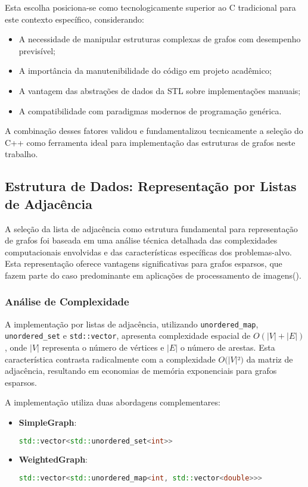 \documentclass{sbc2023}%
\begin{document}
Esta escolha posiciona-se como tecnologicamente superior ao C tradicional para este contexto específico, considerando:
\begin{itemize}
\item A necessidade de manipular estruturas complexas de grafos com desempenho previsível;
\item A importância da manutenibilidade do código em projeto acadêmico;
\item A vantagem das abstrações de dados da STL sobre implementações manuais;
\item A compatibilidade com paradigmas modernos de programação genérica.
\end{itemize}

A combinação desses fatores validou e fundamentalizou tecnicamente a seleção do C++ como ferramenta ideal para implementação das estruturas de grafos neste trabalho.

\subsection{Estrutura de Dados: Representação por Listas de Adjacência}

A seleção da lista de adjacência como estrutura fundamental para representação de grafos foi baseada em uma análise técnica detalhada das complexidades computacionais envolvidas e das características específicas dos problemas-alvo. Esta representação oferece vantagens significativas para grafos esparsos, que fazem parte do caso predominante em aplicações de processamento de imagens(\cite{boost-adjacency-list}).

\subsubsection{Análise de Complexidade}
A implementação por listas de adjacência, utilizando \texttt{unordered\_map}, \texttt{unordered\_set} e \texttt{std::vector}, apresenta complexidade espacial de \(O(|V| + |E|)\), onde \(|V|\) representa o número de vértices e \(|E|\) o número de arestas. Esta característica contrasta radicalmente com a complexidade \(O(|V|\)²\()\) da matriz de adjacência, resultando em economias de memória exponenciais para grafos esparsos.

A implementação utiliza duas abordagens complementares:
\begin{itemize}
    \item \textbf{SimpleGraph}: 
    \begin{lstlisting}[language=C++]
    std::vector<std::unordered_set<int>>
    \end{lstlisting}
    
    \item \textbf{WeightedGraph}: 
    \begin{lstlisting}[language=C++]
    std::vector<std::unordered_map<int, std::vector<double>>>
    \end{lstlisting}
\end{itemize}
\end{document}
